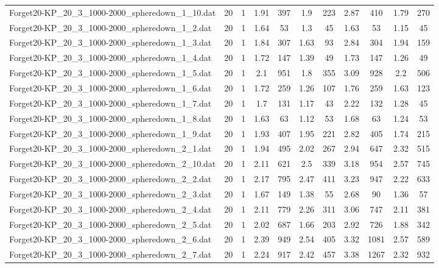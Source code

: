\begin{table}[!ht]
\begin{tabular}{lcccccccccc}
Forget20-KP\_20\_3\_1000-2000\_spheredown\_1\_10.dat & 20 & 1 & 1.91 & 397 & 1.9 & 223 & 2.87 & 410 & 1.79 & 270 \\
Forget20-KP\_20\_3\_1000-2000\_spheredown\_1\_2.dat & 20 & 1 & 1.64 & 53 & 1.3 & 45 & 1.63 & 53 & 1.15 & 45 \\
Forget20-KP\_20\_3\_1000-2000\_spheredown\_1\_3.dat & 20 & 1 & 1.84 & 307 & 1.63 & 93 & 2.84 & 304 & 1.94 & 159 \\
Forget20-KP\_20\_3\_1000-2000\_spheredown\_1\_4.dat & 20 & 1 & 1.72 & 147 & 1.39 & 49 & 1.73 & 147 & 1.26 & 49 \\
Forget20-KP\_20\_3\_1000-2000\_spheredown\_1\_5.dat & 20 & 1 & 2.1 & 951 & 1.8 & 355 & 3.09 & 928 & 2.2 & 506 \\
Forget20-KP\_20\_3\_1000-2000\_spheredown\_1\_6.dat & 20 & 1 & 1.72 & 259 & 1.26 & 107 & 1.76 & 259 & 1.63 & 123 \\
Forget20-KP\_20\_3\_1000-2000\_spheredown\_1\_7.dat & 20 & 1 & 1.7 & 131 & 1.17 & 43 & 2.22 & 132 & 1.28 & 45 \\
Forget20-KP\_20\_3\_1000-2000\_spheredown\_1\_8.dat & 20 & 1 & 1.63 & 63 & 1.12 & 53 & 1.68 & 63 & 1.24 & 53 \\
Forget20-KP\_20\_3\_1000-2000\_spheredown\_1\_9.dat & 20 & 1 & 1.93 & 407 & 1.95 & 221 & 2.82 & 405 & 1.74 & 215 \\
Forget20-KP\_20\_3\_1000-2000\_spheredown\_2\_1.dat & 20 & 1 & 1.94 & 495 & 2.02 & 267 & 2.94 & 647 & 2.32 & 515 \\
Forget20-KP\_20\_3\_1000-2000\_spheredown\_2\_10.dat & 20 & 1 & 2.11 & 621 & 2.5 & 339 & 3.18 & 954 & 2.57 & 745 \\
Forget20-KP\_20\_3\_1000-2000\_spheredown\_2\_2.dat & 20 & 1 & 2.17 & 795 & 2.47 & 411 & 3.23 & 947 & 2.22 & 633 \\
Forget20-KP\_20\_3\_1000-2000\_spheredown\_2\_3.dat & 20 & 1 & 1.67 & 149 & 1.38 & 55 & 2.68 & 90 & 1.36 & 57 \\
Forget20-KP\_20\_3\_1000-2000\_spheredown\_2\_4.dat & 20 & 1 & 2.11 & 779 & 2.26 & 311 & 3.06 & 747 & 2.11 & 381 \\
Forget20-KP\_20\_3\_1000-2000\_spheredown\_2\_5.dat & 20 & 1 & 2.02 & 687 & 1.66 & 203 & 2.92 & 726 & 1.88 & 342 \\
Forget20-KP\_20\_3\_1000-2000\_spheredown\_2\_6.dat & 20 & 1 & 2.39 & 949 & 2.54 & 405 & 3.32 & 1081 & 2.57 & 589 \\
Forget20-KP\_20\_3\_1000-2000\_spheredown\_2\_7.dat & 20 & 1 & 2.24 & 917 & 2.42 & 457 & 3.38 & 1267 & 2.32 & 932 \\

\end{tabular}
\end{table}
